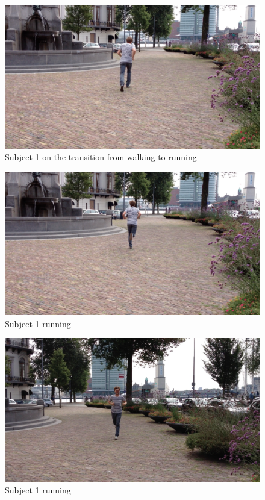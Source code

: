 
\begin{figure}
\centering
  \includegraphics[width=1\textwidth]{./Figures/chapter6/data_collection/stills/jos cp walk-run.png}
  \caption[Recording still 1]{Subject 1 on the transition from walking to running}
\end{figure}

\begin{figure}
\centering
  \includegraphics[width=1\textwidth]{./Figures/chapter6/data_collection/stills/jos run 2.png}
  \caption[Recording still 2]{Subject 1 running}
\end{figure}

\begin{figure}
\centering
  \includegraphics[width=1\textwidth]{./Figures/chapter6/data_collection/stills/jos run.png}
  \caption[Recording still 3]{Subject 1 running}
\end{figure}


